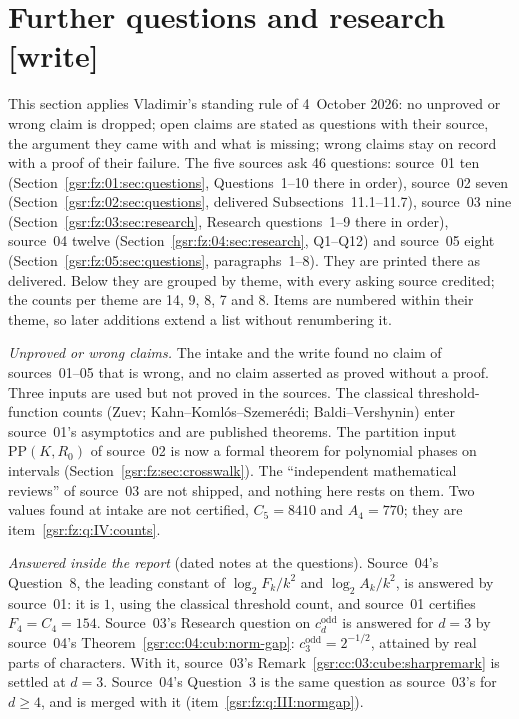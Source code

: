 \documentclass[11pt,letterpaper]{article}
\numberwithin{equation}{section}
\theoremstyle{definition}
\theoremstyle{remark}
\newcommand{\1}{\mathbf 1}
\newcommand{\wtag}{\textup{\textbf{[write]}}}
\begin{document}
\section{Further questions and research \wtag}\label{gsr:fz:sec:further}
\par{}\par
This section applies Vladimir's standing rule of 4~October 2026: no unproved or wrong claim is dropped; open claims are stated as questions with their source, the argument they came with and what is missing; wrong claims stay on record with a proof of their failure. The five sources ask 46 questions: source~01 ten (Section~\ref{gsr:fz:01:sec:questions}, Questions~1--10 there in order), source~02 seven (Section~\ref{gsr:fz:02:sec:questions}, delivered Subsections~11.1--11.7), source~03 nine (Section~\ref{gsr:fz:03:sec:research}, Research questions~1--9 there in order), source~04 twelve (Section~\ref{gsr:fz:04:sec:research}, Q1--Q12) and source~05 eight (Section~\ref{gsr:fz:05:sec:questions}, paragraphs~1--8). They are printed there as delivered. Below they are grouped by theme, with every asking source credited; the counts per theme are 14, 9, 8, 7 and 8. Items are numbered within their theme, so later additions extend a list without renumbering it.

\emph{Unproved or wrong claims.} The intake and the write found no claim of sources~01--05 that is wrong, and no claim asserted as proved without a proof. Three inputs are used but not proved in the sources. The classical threshold-function counts (Zuev; Kahn--Koml\'os--Szemer\'edi; Baldi--Vershynin) enter source~01's asymptotics and are published theorems. The partition input $\mathrm{PP}(K,R_0)$ of source~02 is now a formal theorem for polynomial phases on intervals (Section~\ref{gsr:fz:sec:crosswalk}). The ``independent mathematical reviews'' of source~03 are not shipped, and nothing here rests on them. Two values found at intake are not certified, $C_5=8410$ and $A_4=770$; they are item~\ref{gsr:fz:q:IV:counts}.

\emph{Answered inside the report} (dated notes at the questions). Source~04's Question~8, the leading constant of $\log_2F_k/k^2$ and $\log_2A_k/k^2$, is answered by source~01: it is $1$, using the classical threshold count, and source~01 certifies $F_4=C_4=154$. Source~03's Research question on $c_d^{\mathrm{odd}}$ is answered for $d=3$ by source~04's Theorem~\ref{gsr:cc:04:cub:norm-gap}: $c_3^{\mathrm{odd}}=2^{-1/2}$, attained by real parts of characters. With it, source~03's Remark~\ref{gsr:cc:03:cube:sharpremark} is settled at $d=3$. Source~04's Question~3 is the same question as source~03's for $d\ge4$, and is merged with it (item~\ref{gsr:fz:q:III:normgap}).
\end{document}
